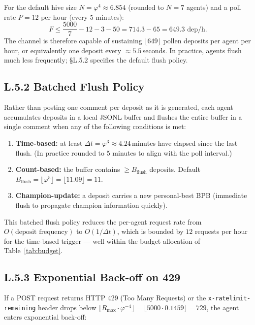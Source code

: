 For the default hive size $N = \varphi^{4} \approx 6.854$ (rounded to
$N = 7$ agents) and a poll rate $P = 12$ per hour (every 5 minutes):
\[
  F \leq \frac{5000}{7} - 12 - 3 - 50 = 714.3 - 65 = 649.3 \text{ dep/h}.
\]
The channel is therefore capable of sustaining $\lfloor 649 \rfloor$
pollen deposits per agent per hour, or equivalently one deposit every
$\approx 5.5$\,seconds.  In practice, agents flush much less
frequently; §L.5.2 specifies the default flush policy.

\subsection*{L.5.2 \quad Batched Flush Policy}

Rather than posting one comment per deposit as it is generated, each
agent accumulates deposits in a local JSONL buffer and flushes the
entire buffer in a single comment when any of the following conditions
is met:

\begin{enumerate}
\item \textbf{Time-based:} at least $\Delta t = \varphi^{3} \approx
  4.24$\,minutes have elapsed since the last flush.  (In practice
  rounded to 5 minutes to align with the poll interval.)
\item \textbf{Count-based:} the buffer contains $\geq B_{\text{flush}}$
  deposits.  Default $B_{\text{flush}} = \lfloor \varphi^{5} \rfloor
  = \lfloor 11.09 \rfloor = 11$.
\item \textbf{Champion-update:} a deposit carries a new personal-best
  BPB (immediate flush to propagate champion information quickly).
\end{enumerate}

This batched flush policy reduces the per-agent request rate from
$O(\text{deposit frequency})$ to $O(1/\Delta t)$, which is bounded by
$12$ requests per hour for the time-based trigger — well within the
budget allocation of Table~\ref{tab:budget}.

\subsection*{L.5.3 \quad Exponential Back-off on 429}

If a POST request returns HTTP 429 (Too Many Requests) or the
\texttt{x-ratelimit-remaining} header drops below
$\lfloor R_{\max} \cdot \varphi^{-4} \rfloor = \lfloor 5000 \cdot
0.1459 \rfloor = 729$, the agent enters exponential back-off:

